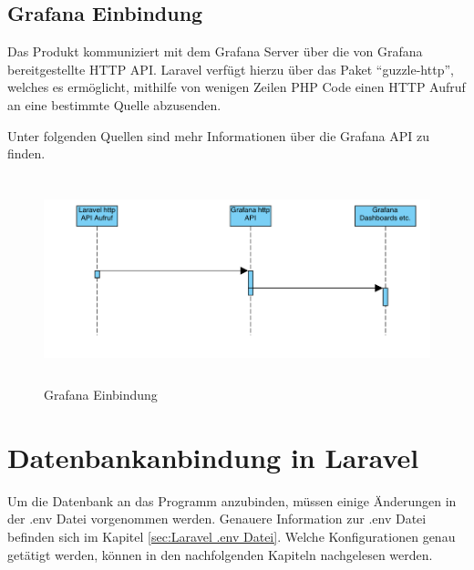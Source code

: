 \subsection{Grafana Einbindung}
Das Produkt kommuniziert mit dem Grafana Server über die von Grafana bereitgestellte HTTP API. Laravel verfügt hierzu über das Paket “guzzle-http”, welches es ermöglicht, mithilfe von wenigen Zeilen PHP Code einen HTTP Aufruf an eine bestimmte Quelle abzusenden.

Unter folgenden  Quellen \cite{Kron3,Kron4} sind mehr Informationen über die Grafana API zu finden.


\begin{figure}[h]
	\centering
	\includegraphics[height=6cm,width=18cm]{images/GrafanaEinbindung}
	\caption{Grafana Einbindung}
	\label{fig:GrafanaEinbindung}
\end{figure}




\newpage
\section{Datenbankanbindung in Laravel}
Um die Datenbank an das Programm anzubinden, müssen einige Änderungen in der .env Datei vorgenommen werden. Genauere Information zur .env Datei befinden sich im Kapitel  \ref{sec:Laravel .env Datei}. Welche Konfigurationen genau getätigt werden, können in den nachfolgenden Kapiteln nachgelesen werden. 

